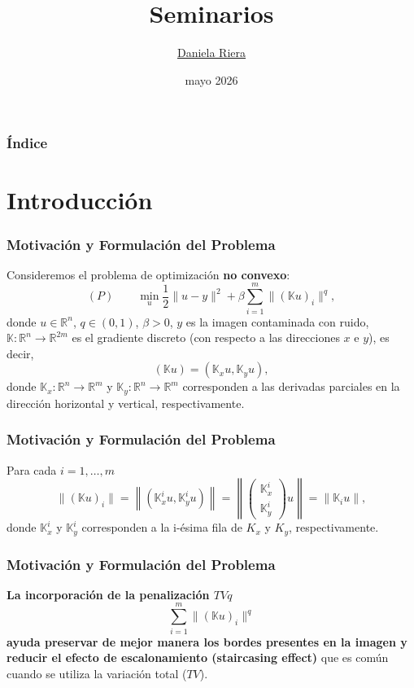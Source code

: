 \documentclass{beamer}
\title[Maestría en Optimización Matemática]{Seminarios}
\author{\large{
 \underline{Daniela Riera} %
}}
\institute{\large{
Centro de Modelización Matemática (MODEMAT)}
\medskip}
\date{\small{mayo 2026}}
\begin{document}
\begin{frame}
\titlepage %
\end{frame}
\begin{frame}
\frametitle{Índice}
\tableofcontents
\end{frame}
\justify
\section{Introducción}
\begin{frame}
\frametitle{Motivación y Formulación del Problema}
Consideremos el problema de optimización {\bf no convexo}: 
\begin{equation*}
        (P)\qquad \displaystyle \min_{u} \frac{1}{2}\|u-y\|^2+\beta \sum_{i=1}^m\|(\mathbb{K}u)_i\|^q,
   \end{equation*}
donde $u\in \mathbb{R}^n$, $q\in(0,1)$, $\beta>0$, $y$ es la imagen contaminada con ruido, $\mathbb{K}:\mathbb{R}^n\to \mathbb{R}^{2m}$ es el gradiente discreto (con respecto a las direcciones $x$ e $y$), es decir, 
$$
(\mathbb{K}u)=(\mathbb{K}_xu, \mathbb{K}_yu), 
$$
donde $\mathbb{K}_x:\mathbb{R}^n\to\mathbb{R}^m$ y $\mathbb{K}_y:\mathbb{R}^n\to \mathbb{R}^m$ corresponden a las derivadas parciales en la dirección horizontal y vertical, respectivamente. 


\end{frame}
\justify
\begin{frame}
\frametitle{Motivación y Formulación del Problema}
Para cada $i=1,\ldots,m$
\begin{equation*}
    \|(\mathbb{K}u)_i\|=\left\|(\mathbb{K}_x^iu,\mathbb{K}_y^iu)\right\|=\left\|\left(\begin{array}{c}
        \mathbb{K}_x^i\\
        \mathbb{K}_y^i
    \end{array}\right)u\right\|=\|\mathbb{K}_iu\|,
\end{equation*}
donde $\mathbb{K}_x^i$ y $\mathbb{K}_y^i$ corresponden a la i-ésima fila de $K_x$ y $K_y$, respectivamente.\vspace{0.5cm}
\end{frame}
\begin{frame}
\frametitle{Motivación y Formulación del Problema}
\textbf{La incorporación de la penalización $TVq$}
$$
\sum_{i=1}^m\|(\mathbb{K}u)_i\|^q
$$
\textbf{ayuda preservar de mejor manera los bordes presentes en la imagen y reducir el efecto de escalonamiento (staircasing effect)} que es común cuando se utiliza la variación total ($TV$).
\end{frame}
\justify
\end{document}
